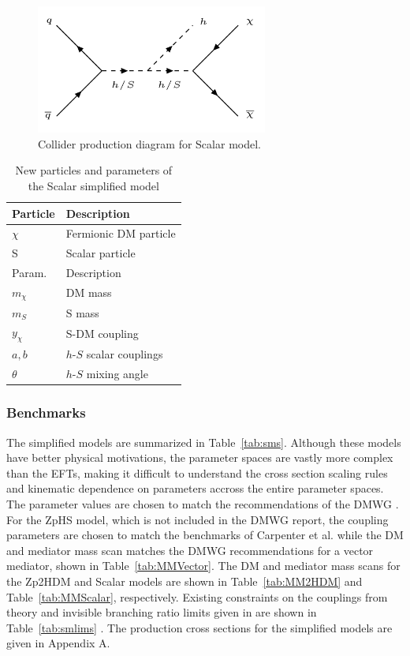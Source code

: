 \begin{figure}[tbh]
\centering
\includegraphics[width=3in]{figures/scsig.png}
\caption{Collider production diagram for Scalar model.}
\label{fig:scsig}
\end{figure}

\begin{table}[htbH]
\begin{center}
\begin{tabular}{ l | l}
\hline
Particle & Description \\
\hline
$\chi$ & Fermionic DM particle \\
S & Scalar particle \\
\hline
Param. & Description \\
\hline
$m_\chi$ & DM mass \\
$m_{S}$ & S mass \\
$y_\chi$ & S-DM coupling \\
$a, b$ & $h$-$S$ scalar couplings \\
$\theta$ & $h$-$S$ mixing angle \\
\hline
\end{tabular}
\caption{New particles and parameters of the Scalar simplified model \cite{Carpenter:2013xra}}\label{tab:Scalar}
\end{center}
\end{table}


\subsubsection{Benchmarks}\label{sec:sigbench}

The simplified models are summarized in Table~\ref{tab:sms}. Although these models have better physical motivations, the parameter spaces are vastly more complex than the EFTs, making it difficult to understand the cross section scaling rules and kinematic dependence on parameters accross the entire parameter spaces. The parameter values are chosen to match the recommendations of the DMWG \cite{Abercrombie:2015wmb}. For the ZpHS model, which is not included in the DMWG report, the coupling parameters are chosen to match the benchmarks of Carpenter et al. \cite{Carpenter:2013xra} while the DM and mediator mass scan matches the DMWG recommendations for a vector mediator, shown in Table~\ref{tab:MMVector}. The DM and mediator mass scans for the Zp2HDM and Scalar models are shown in Table~\ref{tab:MM2HDM} and Table~\ref{tab:MMScalar}, respectively. Existing constraints on the couplings from theory and invisible branching ratio limits given in are shown in Table~\ref{tab:smlims} \cite{Carpenter:2013xra}. The production cross sections for the simplified models are given in Appendix A. 

